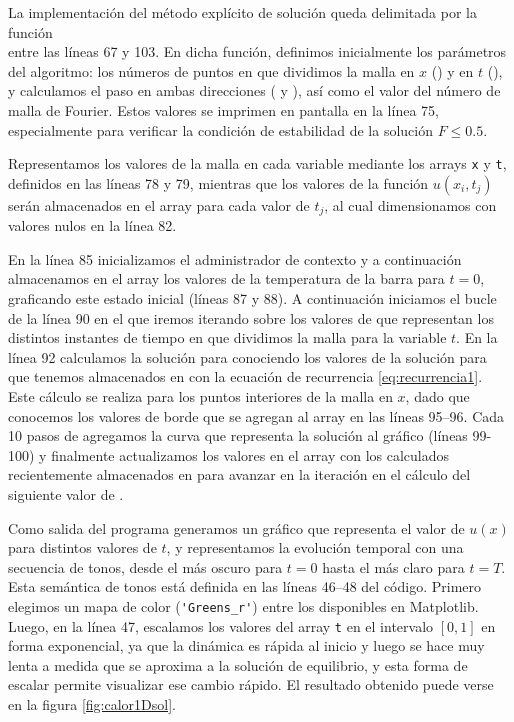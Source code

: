 
La implementación del método explícito de solución queda delimitada por la función \\  entre las líneas 67 y 103. En dicha función, definimos inicialmente los parámetros del algoritmo: los números de puntos en que dividimos la malla en $x$ () y en $t$ (), y calculamos el paso en ambas direcciones ( y ), así como el valor del número de malla de Fourier. Estos valores se imprimen en pantalla en la línea 75, especialmente para verificar la condición de estabilidad de la solución $F \leq 0.5$.

Representamos los valores de la malla en cada variable mediante los arrays \verb|x| y \verb|t|, definidos en las líneas 78 y 79, mientras que los valores de la función $u(x_i, t_j)$ serán almacenados en el array  para cada valor de $t_j$, al cual dimensionamos con  valores nulos en la línea 82.

En la línea 85 inicializamos el administrador de contexto y a continuación almacenamos en el array  los valores de la temperatura de la barra para $t=0$, graficando este estado inicial (líneas 87 y 88). A continuación iniciamos el bucle de la línea 90 en el que iremos iterando sobre los valores de  que representan los distintos instantes de tiempo en que dividimos la malla para la variable $t$. En la línea 92 calculamos la solución para  conociendo los valores de la solución para  que tenemos almacenados en  con la ecuación de recurrencia \eqref{eq:recurrencia1}. Este cálculo se realiza para los puntos interiores de la malla en $x$, dado que conocemos los valores de borde que se agregan al array  en las líneas 95--96. Cada 10 pasos de  agregamos la curva que representa la solución al gráfico (líneas 99-100) y finalmente actualizamos los valores en el array  con los calculados recientemente almacenados en  para avanzar en la iteración en el cálculo del siguiente valor de .

Como salida del programa generamos un gráfico que representa el valor de $u(x)$ para distintos valores de $t$, y representamos la evolución temporal con una secuencia de tonos, desde el más oscuro para $t=0$ hasta el más claro para $t=T$. Esta semántica de tonos está definida en las líneas 46--48 del código. Primero elegimos un mapa de color (\verb|'Greens_r'|) entre los disponibles en Matplotlib. Luego, en la línea 47, escalamos los valores del array \verb|t| en el intervalo $[0,1]$ en forma exponencial, ya que la dinámica es rápida al inicio y luego se hace muy lenta a medida que se aproxima a la solución de equilibrio, y esta forma de escalar permite visualizar ese cambio rápido. El resultado obtenido puede verse en la figura \ref{fig:calor1Dsol}.

